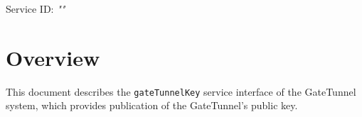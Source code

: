 \documentclass[a4paper]{arrowhead}
\begin{document}
\sloppy

\ArrowheadSetup

\begin{center}
  \vspace*{1cm}
  \huge{\arrowtitle}

  \vspace*{0.2cm}
  \LARGE{\arrowtype}
  \vspace*{1cm}

  \Large{Service ID: \textit{"\arrowid"}}

  \vspace*{\fill}


  \vspace*{1cm}
  \vspace*{\fill}

  \begin{abstract}
    This document describes the HTTP/1.1 protocol with TLS payload security and JSON payload encoding variant of the \texttt{gateTunnelKey} service of the GateTunnel system.
  \end{abstract}

  \vspace*{1cm}
\end{center}

\newpage

\tableofcontents
\newpage

\section{Overview}
\label{sec:overview}

This document describes the \texttt{gateTunnelKey} service interface of the GateTunnel system, which provides publication of the GateTunnel's public key.
\end{document}
